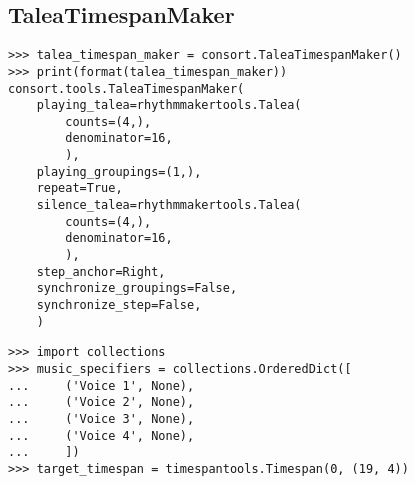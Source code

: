 \subsection{TaleaTimespanMaker} %

\begin{comment}
<abjad>
talea_timespan_maker = consort.TaleaTimespanMaker()
print(format(talea_timespan_maker))
</abjad>
\end{comment}

\begin{singlespacing}
\vspace{-0.5\baselineskip}
\begin{lstlisting}
>>> talea_timespan_maker = consort.TaleaTimespanMaker()
>>> print(format(talea_timespan_maker))
consort.tools.TaleaTimespanMaker(
    playing_talea=rhythmmakertools.Talea(
        counts=(4,),
        denominator=16,
        ),
    playing_groupings=(1,),
    repeat=True,
    silence_talea=rhythmmakertools.Talea(
        counts=(4,),
        denominator=16,
        ),
    step_anchor=Right,
    synchronize_groupings=False,
    synchronize_step=False,
    )
\end{lstlisting}
\end{singlespacing}

\begin{comment}
<abjad>
import collections
music_specifiers = collections.OrderedDict([
    ('Voice 1', None),
    ('Voice 2', None),
    ('Voice 3', None),
    ('Voice 4', None),
    ])
target_timespan = timespantools.Timespan(0, (19, 4))
</abjad>
\end{comment}

\begin{singlespacing}
\vspace{-0.5\baselineskip}
\begin{lstlisting}
>>> import collections
>>> music_specifiers = collections.OrderedDict([
...     ('Voice 1', None),
...     ('Voice 2', None),
...     ('Voice 3', None),
...     ('Voice 4', None),
...     ])
>>> target_timespan = timespantools.Timespan(0, (19, 4))
\end{lstlisting}
\end{singlespacing}

\begin{comment}
<abjad>
result = talea_timespan_maker(
    music_specifiers=music_specifiers,
    target_timespan=target_timespan,
    )
show(result, key='voice_name')
</abjad>
\end{comment}

